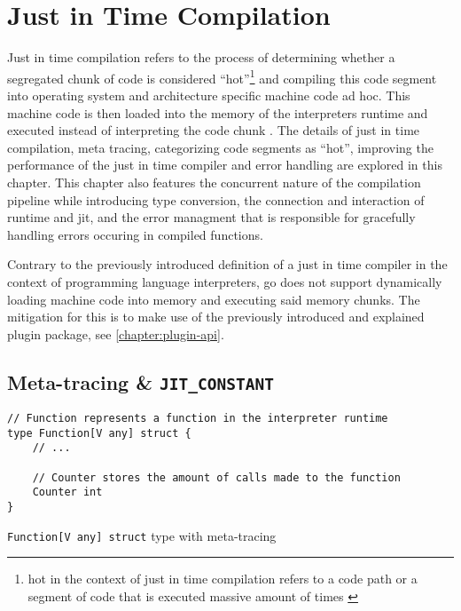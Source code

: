 \chapter{Just in Time Compilation}

Just in time compilation refers to the process of determining whether a
segregated chunk of code is considered ``hot''\footnote{hot in the context of
just in time compilation refers to a code path or a segment of code that is
executed massive amount of times \cite{jvm_ibm_optlevel, jvm_efficient}} and
compiling this code segment into operating system and architecture specific
machine code ad hoc. This machine code is then loaded into the memory of the
interpreters runtime and executed instead of interpreting the code chunk
\cite{jvm_efficient}. The details of just in time compilation, meta tracing,
categorizing code segments as ``hot'', improving the performance of the just in
time compiler and error handling are explored in this chapter. This chapter
also features the concurrent nature of the compilation pipeline while
introducing type conversion, the connection and interaction of runtime and jit,
and the error managment that is responsible for gracefully handling errors
occuring in compiled functions.

Contrary to the previously introduced definition of a just in time compiler in
the context of programming language interpreters, go does not support
dynamically loading machine code into memory and executing said memory chunks.
The mitigation for this is to make use of the previously introduced and
explained plugin package, see \autoref{chapter:plugin-api}. 

\section{Meta-tracing \& \texttt{JIT\_CONSTANT}}
\label{sec:meta-tracing-jit-constant}

\begin{listing}[H]
    \begin{verbatim}
// Function represents a function in the interpreter runtime
type Function[V any] struct {
    // ...

    // Counter stores the amount of calls made to the function
    Counter int
}
    \end{verbatim}
    \caption{\texttt{Function[V any] struct} type with meta-tracing}
    \label{code:meta-tracing-counter}
\end{listing}

